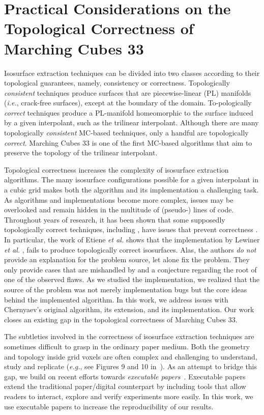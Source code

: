 \chapter{Practical Considerations on the Topological Correctness of Marching Cubes 33}
\label{chap:mc33}

Isosurface extraction techniques can be divided into two classes according to their topological guarantees, namely, consistency or correctness. Topologically \emph{consistent} techniques produce surfaces that are piecewise-linear (PL) manifolds (\emph{i.e.}, crack-free surfaces), except at the boundary of the domain. To-pologically \emph{correct} techniques produce a PL-manifold homeomorphic to the surface induced by a given interpolant, such as the trilinear interpolant. Although there are many topologically \emph{consistent} MC-based techniques, only a handful are topologically \emph{correct}. Marching Cubes 33 is one of the first MC-based algorithms that aim to preserve the topology of the trilinear interpolant.

Topological correctness increases the complexity of isosurface extraction algorithms. 
The many isosurface configurations possible for a given interpolant in a cubic grid makes both the algorithm and its implementation a challenging task. 
%
As algorithms and implementations become more complex, issues may be overlooked and remain hidden in the multitude of (pseudo-) lines of code.
%
Throughout years of research, it has been shown that some supposedly topologically correct techniques, including \mc, have issues that prevent correctness  \cite{Etiene:2012:TVI:2197070.2197097, lopes:tvcg:2003, newman:candg:2006}. 
%
In particular, the work of Etiene \emph{et al.} \cite{Etiene:2012:TVI:2197070.2197097} shows that the \mc{} implementation by Lewiner \emph{et al.} \cite{lewiner:impl,Lewiner:2003}, fails to produce topologically correct isosurfaces. 
%
Alas, the authors \emph{do not} provide an explanation for the problem source, let alone fix the problem. 
%
They only provide cases that are mishandled by \mc{} and a conjecture regarding  the root of one of the observed flaws.
%
As we studied the \mc{} implementation, we realized that the source of the problem was not merely implementation bugs but the core ideas behind the implemented algorithm.  
%
In this work, we address issues with Chernyaev's original algorithm, its extension, and its implementation. 
%
Our work closes an existing gap in the topological correctness of Marching Cubes 33.
 
 The subtleties involved in the correctness of isosurface extraction techniques are sometimes difficult to grasp in the ordinary paper medium. Both the geometry and topology inside grid voxels are often complex and challenging to understand,  study and replicate ({\em e.g.}, see Figures 9 and 10 in~\cite{Nielson03onmarching}).  As an attempt to bridge this gap, we build on recent efforts towards \emph{executable papers}~\cite{Koop:2011tv, Tohline:2010jn}. Executable papers extend the traditional paper/digital counterpart by including tools that allow readers to interact, explore and verify experiments more easily.  In this work, we use executable papers to increase the reproducibility of our results.
 
